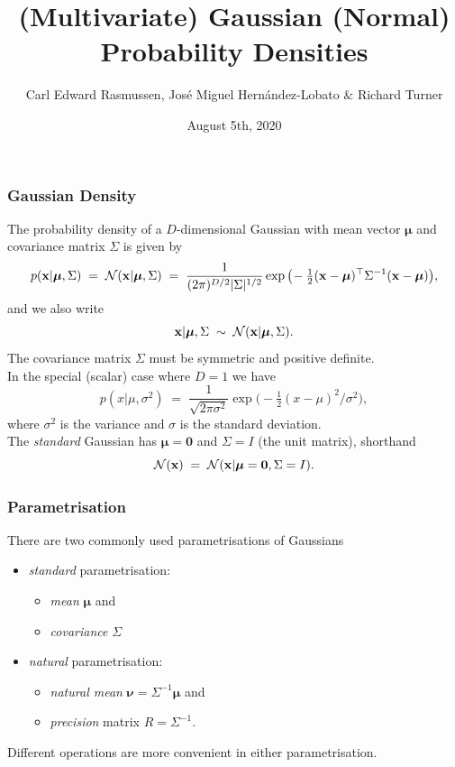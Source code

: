 

\title[Gaussian Densities]{(Multivariate) Gaussian (Normal)\\ Probability Densities}
\author[Rasmussen, Hern\'andez-Lobato \& Turner]{Carl Edward
  Rasmussen,  Jos\'e Miguel Hern\'andez-Lobato \& Richard Turner}
\date{August 5th, 2020}



\begin{frame}
\titlepage
\end{frame}

\begin{frame}
\frametitle{Gaussian Density}

The probability density of a $D$-dimensional Gaussian with mean vector
$\boldsymbol{\mu}$ and covariance matrix $\Sigma$ is given by
%
\[
p({\bf x}|\boldsymbol{\mu},\Sigma)\;=\;
{\cal N}({\bf x}|\boldsymbol{\mu},\Sigma)\;=\;\frac{1}{(2\pi)^{D/2}|\Sigma|^{1/2}}
\exp\big(\!-\tfrac{1}{2}({\bf x}-\boldsymbol{\mu})^\top \Sigma^{-1}
({\bf x}-\boldsymbol{\mu})\big),
\]
%
and we also write
%
\[
{\bf x}|\boldsymbol{\mu},\Sigma\;\sim\;{\cal N}({\bf x}|\boldsymbol{\mu},\Sigma).
\]
%
The covariance matrix $\Sigma$ must be symmetric and positive definite.\\[1ex]

In the special (scalar) case where $D=1$ we have
%
\[
p(x|\mu,\sigma^2)\;=\;\frac{1}{\sqrt{2\pi\sigma^2}}
\exp\big(\!-\tfrac{1}{2}(x-\mu)^2/\sigma^2\big),
\]
%
where $\sigma^2$ is the variance and $\sigma$ is the standard deviation.\\[1ex]

The \emph{standard} Gaussian has $\boldsymbol{\mu}=\boldsymbol{0}$ and
$\Sigma=I$ (the unit matrix), shorthand
%
\[
{\cal N}({\bf x})\;=\;{\cal
  N}({\bf x}|\boldsymbol{\mu}=\boldsymbol{0},\Sigma=I).
\]

\end{frame}

\begin{frame}
\frametitle{Parametrisation}

There are two commonly used parametrisations of Gaussians
\begin{itemize}
\item \emph{standard} parametrisation:
\begin{itemize}
\item \emph{mean} $\boldsymbol{\mu}$ and
\item \emph{covariance} $\Sigma$
\end{itemize}
\item \emph{natural} parametrisation:
\begin{itemize}
\item \emph{natural mean}
  $\boldsymbol{\nu}=\Sigma^{-1}\boldsymbol{\mu}$ and
\item \emph{precision} matrix $R=\Sigma^{-1}$.
\end{itemize}
\end{itemize}
Different operations are more convenient in either parametrisation.

\end{frame}

